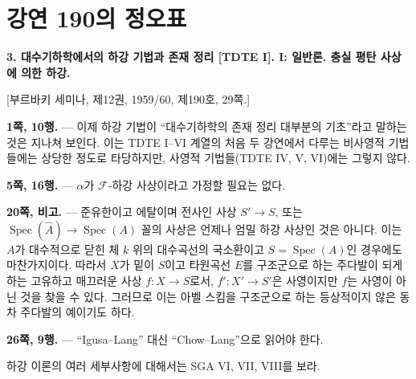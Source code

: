 \clearpage
\chapter*{강연 190의 정오표}
\setcounter{footnote}{0}

\noindent\textbf{3. 대수기하학에서의 하강 기법과 존재 정리
[TDTE I]. I: 일반론. 충실 평탄 사상에 의한 하강.}

\begin{center}
[부르바키 세미나, 제12권, 1959/60, 제190호, 29쪽.]
\end{center}

\noindent\textbf{1쪽, 10행.} --- 이제 하강 기법이 ``대수기하학의
존재 정리 대부분의 기초''라고 말하는 것은 지나쳐 보인다. 이는 TDTE
I--VI 계열의 처음 두 강연에서 다루는 비사영적 기법들에는 상당한
정도로 타당하지만, 사영적 기법들(TDTE IV, V, VI)에는 그렇지 않다.

\noindent\textbf{5쪽, 16행.} --- $\alpha$가 $\mathcal F$-하강 사상이라고
가정할 필요는 없다.

\noindent\textbf{20쪽, 비고.} --- 준유한이고 에탈이며 전사인 사상
$S'\longrightarrow S$, 또는
$\operatorname{Spec}(\widehat A)\longrightarrow\operatorname{Spec}(A)$
꼴의 사상은 언제나 엄밀 하강 사상인 것은 아니다. 이는 $A$가
대수적으로 닫힌 체 $k$ 위의 대수곡선의 국소환이고
$S=\operatorname{Spec}(A)$인 경우에도 마찬가지이다. 따라서 $X$가 밑이
$S$이고 타원곡선 $E$를 구조군으로 하는 주다발이 되게 하는 고유하고
매끄러운 사상 $f:X\longrightarrow S$로서,
$f':X'\longrightarrow S'$은 사영이지만 $f$는 사영이 아닌 것을 찾을
수 있다. 그러므로 이는 아벨 스킴을 구조군으로 하는 등상적이지 않은
동차 주다발의 예이기도 하다.

\noindent\textbf{26쪽, 9행.} --- ``Igusa--Lang'' 대신 ``Chow--Lang''으로
읽어야 한다.

하강 이론의 여러 세부사항에 대해서는 SGA VI, VII, VIII를 보라.

